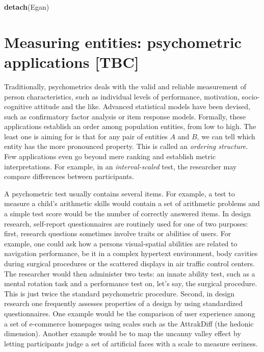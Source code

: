 \documentclass[]{svmono}
\newenvironment{Shaded}{\begin{snugshade}}{\end{snugshade}}
\newcommand{\KeywordTok}[1]{\textcolor[rgb]{0.13,0.29,0.53}{\textbf{#1}}}
\newcommand{\NormalTok}[1]{#1}
\theoremstyle{definition}
\theoremstyle{definition}
\theoremstyle{definition}
\theoremstyle{remark}
\begin{document}
\begin{Shaded}
\begin{Highlighting}[]
\KeywordTok{detach}\NormalTok{(Egan)}
\end{Highlighting}
\end{Shaded}

\section{Measuring entities: psychometric applications
{[}TBC{]}}\label{measuring-entities-psychometric-applications-tbc}

Traditionally, psychometrics deals with the valid and reliable
measurement of person characteristics, such as individual levels of
performance, motivation, socio-cognitive attitude and the like. Advanced
statistical models have been devised, such as confirmatory factor
analysis or item response models. Formally, these applications establish
an order among population entities, from low to high. The least one is
aiming for is that for any pair of entities \(A\) and \(B\), we can tell
which entity has the more pronounced property. This is called an
\emph{ordering structure}. Few applications even go beyond mere ranking
and establish metric interpretations. For example, in an
\emph{interval-scaled} test, the researcher may compare differences
between participants.

A psychometric test usually contains several items. For example, a test
to measure a child's arithmetic skills would contain a set of arithmetic
problems and a simple test score would be the number of correctly
answered items. In design research, self-report questionnaires are
routinely used for one of two purposes: first, research questions
sometimes involve traits or abilities of users. For example, one could
ask how a persons visual-spatial abilities are related to navigation
performance, be it in a complex hypertext environment, body cavities
during surgical procedures or the scattered displays in air traffic
control centers. The researcher would then administer two tests: an
innate ability test, such as a mental rotation task and a performance
test on, let's say, the surgical procedure. This is just twice the
standard psychometric procedure. Second, in design research one
frequently assesses properties of a design by using standardized
questionnaires. One example would be the comparison of user experience
among a set of e-commerce homepages using scales such as the AttrakDiff
(the hedonic dimension). Another example would be to map the uncanny
valley effect by letting participants judge a set of artificial faces
with a scale to measure eeriness.
\end{document}
